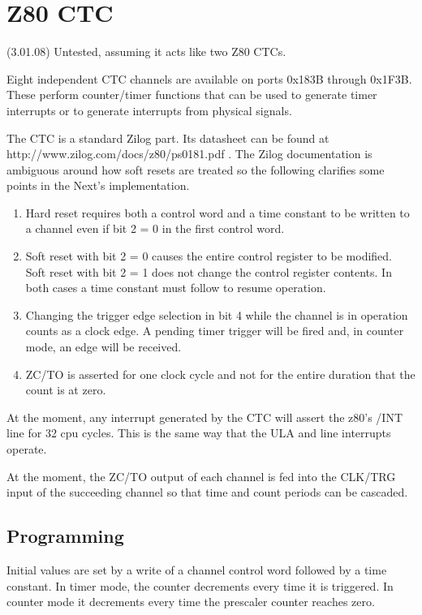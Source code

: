\chapter{Z80 CTC}
(3.01.08) Untested, assuming it acts like two Z80 CTCs.

Eight independent CTC channels are available on ports 0x183B through
0x1F3B.  These perform counter/timer functions that can be used to
generate timer interrupts or to generate interrupts from physical
signals.

The CTC is a standard Zilog part.  Its datasheet can be found at
http://www.zilog.com/docs/z80/ps0181.pdf .  The Zilog documentation is
ambiguous around how soft resets are treated so the following
clarifies some points in the Next's implementation.

\begin{enumerate}
\item Hard reset requires both a control word and a time constant to
  be written to a channel even if bit 2 = 0 in the first control word.
\item Soft reset with bit 2 = 0 causes the entire control register to
  be modified.  Soft reset with bit 2 = 1 does not change the control
  register contents.  In both cases a time constant must follow to
  resume operation.
\item Changing the trigger edge selection in bit 4 while the channel
  is in operation counts as a clock edge.  A pending timer trigger
  will be fired and, in counter mode, an edge will be received.
\item ZC/TO is asserted for one clock cycle and not for the entire
  duration that the count is at zero.
\end{enumerate}
At the moment, any interrupt generated by the CTC will assert the
z80's /INT line for 32 cpu cycles.  This is the same way that the ULA
and line interrupts operate.

At the moment, the ZC/TO output of each channel is fed into the
CLK/TRG input of the succeeding channel so that time and count periods
can be cascaded.

\section{Programming}
Initial values are set by a write of a channel control word followed
by a time constant. In timer mode, the counter decrements every time
it is triggered. In counter mode it decrements every time the
prescaler counter reaches zero.

